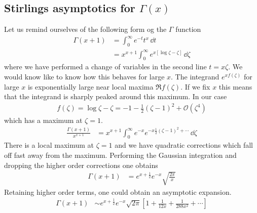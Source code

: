 \documentclass[a4paper,12pt]{article}
\begin{document}
\subsection{Stirlings asymptotics for $\Gamma(x)$}
Let us remind ourselves of the following form og the $\Gamma$ function
\begin{equation}
	\begin{aligned}
		\Gamma(x+1)&=\int_{0}^{\infty}e^{-t} t^x \,\dd t\\
		&=x^{x+1}\int_{0}^{\infty}e^{x\left[\log \zeta-\zeta\right]} \,\dd \zeta
	\end{aligned}
\end{equation}
where we have performed a change of variables in the second line $t=x\zeta$. We would know like to know how this behaves for large $x$. The integrand $e^{xf(\zeta)}$ for large $x$ is exponentially large near local maxima $\Re f(\zeta)$. If we fix $x$ this means that the integrand is sharply peaked around this maximum.  In our case 
\begin{equation}
	\begin{aligned}
		f(\zeta)=\log \zeta -\zeta =-1-\frac{1}{2}(\zeta-1)^2+\mathcal{O}(\zeta^4)
	\end{aligned}
\end{equation}
which has a maximum at $\zeta=1$.
\begin{equation}
	\begin{aligned}
				\frac{\Gamma(x+1)}{x^{x+1}}
		&=x^{x+1}\int_{0}^{\infty}e^{-x}e^{-x\frac{1}{2}(\zeta-1)^2+\cdots} \,\dd \zeta
	\end{aligned}
\end{equation}
There is a local maximum at $\zeta=1$ and we have quadratic corrections which fall off fast away from the maximum. Performing the Gaussian integration and dropping the higher order corrections one obtains
\begin{equation}
	\begin{aligned}
		\Gamma(x+1)
		&=e^{x+\frac{1}{2}}e^{-x}\sqrt{\frac{2\pi}{x}}
	\end{aligned}
\end{equation}
Retaining higher order terms, one could obtain an asymptotic expansion.
\begin{equation}
	\begin{aligned}
		\Gamma(x+1)
		&\sim e^{x+\frac{1}{2}}e^{-x}\sqrt{2\pi}\left[1+\frac{1}{12x}+\frac{1}{288x^2}+\cdots \right]
	\end{aligned}
\end{equation}
\end{document}
